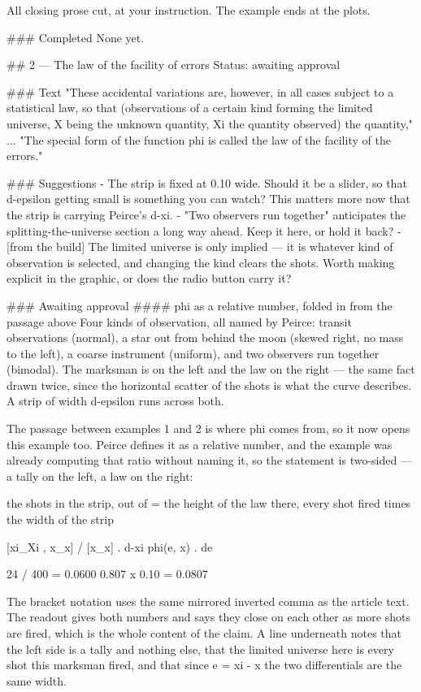 All closing prose cut, at your instruction. The example ends at the plots.

### Completed
None yet.

## 2 — The law of the facility of errors
Status: awaiting approval

### Text
"These accidental variations are, however, in all cases subject to a statistical
law, so that (observations of a certain kind forming the limited universe, X
being the unknown quantity, Xi the quantity observed) the quantity,"
... "The special form of the function phi is called the law of the facility of
the errors."

### Suggestions
- The strip is fixed at 0.10 wide. Should it be a slider, so that d-epsilon
  getting small is something you can watch? This matters more now that the strip
  is carrying Peirce's d-xi.
- "Two observers run together" anticipates the splitting-the-universe section a
  long way ahead. Keep it here, or hold it back?
- [from the build] The limited universe is only implied — it is whatever kind of
  observation is selected, and changing the kind clears the shots. Worth making
  explicit in the graphic, or does the radio button carry it?

### Awaiting approval
#### phi as a relative number, folded in from the passage above
Four kinds of observation, all named by Peirce: transit observations (normal), a
star out from behind the moon (skewed right, no mass to the left), a coarse
instrument (uniform), and two observers run together (bimodal). The marksman is
on the left and the law on the right — the same fact drawn twice, since the
horizontal scatter of the shots is what the curve describes. A strip of width
d-epsilon runs across both.

The passage between examples 1 and 2 is where phi comes from, so it now opens
this example too. Peirce defines it as a relative number, and the example was
already computing that ratio without naming it, so the statement is two-sided —
a tally on the left, a law on the right:

    the shots in the strip, out of      =     the height of the law there,
    every shot fired                          times the width of the strip

    [xi_Xi , x_x] / [x_x] . d-xi              phi(e, x) . de

    24 / 400 = 0.0600                         0.807 x 0.10 = 0.0807

The bracket notation uses the same mirrored inverted comma as the article text.
The readout gives both numbers and says they close on each other as more shots
are fired, which is the whole content of the claim. A line underneath notes that
the left side is a tally and nothing else, that the limited universe here is
every shot this marksman fired, and that since e = xi - x the two differentials
are the same width.

